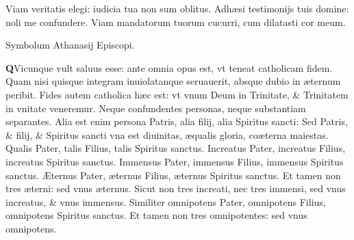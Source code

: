 \documentclass[a5paper,10pt]{book}
\def\ae{æ}
\def\AE{Æ}
\begin{document}
\begin{multicols*}{2}
\newline \color{red} V\color{black}iam veritatis elegi: iudicia tua non sum oblitus.
\newline \color{red} A\color{black}dh\ae si testimonijs tuis domine: noli me confundere.
\newline \color{red} V\color{black}iam mandatorum tuorum cucurri, cum dilatasti cor meum.
\vspace{-1em}
\begin{center} \color{red}
Symbolum Athanasij Episcopi.
\end{center}
\vspace{-1em}
\lettrine[lines=2]{\bfseries \color{red} Q}{}Vicunque vult saluus esse: ante omnia opus est, vt teneat catholicam fidem.
\newline \color{red} Q\color{black}uam nisi quisque integram inuiolatanque seruauerit, absque dubio in \ae ternum peribit.
\newline \color{red} F\color{black}ides autem catholica h\ae c est: vt vnum Deum in Trinitate, \& Trinitatem in vnitate veneremur.
\newline \color{red} N\color{black}eque confundentes personas, neque substantiam separantes.
\newline \color{red} A\color{black}lia est enim persona Patris, alia filij, alia Spiritus sancti:
\newline \color{red} S\color{black}ed Patris, \& filij, \& Spiritus sancti vna est diuinitas, \ae qualis gloria, co\ae terna maiestas.
\newline \color{red} Q\color{black}ualis Pater, talis Filius, talis Spiritus sanctus.
\newline \color{red} I\color{black}ncreatus Pater, increatus Filius, increatus Spiritus sanctus.
\newline \color{red} I\color{black}mmensus Pater, immensus Filius, immensus Spiritus sanctus.
\newline \color{red} \AE \color{black}ternus Pater, \ae ternus Filius, \ae ternus Spiritus sanctus.
\newline \color{red} E\color{black}t tamen non tres \ae terni: sed vnus \ae ternus.
\newline \color{red} S\color{black}icut non tres increati, nec tres immensi, sed vnus increatus, \& vnus immensus.
\newline \color{red} S\color{black}imiliter omnipotens Pater, omnipotens Filius, omnipotens Spiritus sanctus.
\newline \color{red} E\color{black}t tamen non tres omnipotentes: sed vnus omnipotens.

\end{multicols*}
\end{document}
